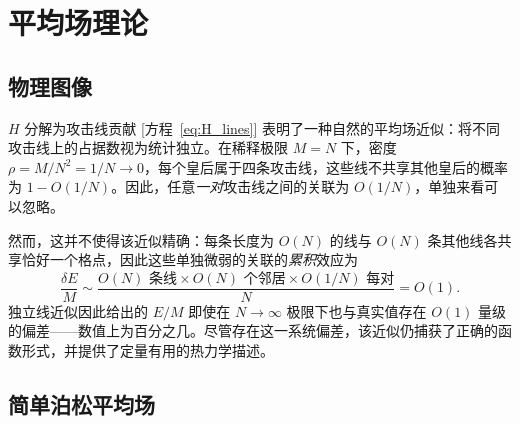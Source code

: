 \documentclass[aps, pre, reprint, amsmath, amssymb, superscriptaddress, floatfix]{revtex4-2}
\begin{document}
\section{平均场理论}
\label{sec:mf}

\subsection{物理图像}

$H$ 分解为攻击线贡献 [方程~\eqref{eq:H_lines}] 表明了一种自然的平均场近似：将不同攻击线上的占据数视为统计独立。在稀释极限 $M = N$ 下，密度 $\rho = M/N^2 = 1/N \to 0$，每个皇后属于四条攻击线，这些线不共享其他皇后的概率为 $1 - O(1/N)$。因此，任意\emph{一对}攻击线之间的关联为 $O(1/N)$，单独来看可以忽略。

然而，这并不使得该近似精确：每条长度为 $O(N)$ 的线与 $O(N)$ 条其他线各共享恰好一个格点，因此这些单独微弱的关联的\emph{累积}效应为
\begin{equation}
  \frac{\delta E}{M}
  \sim \frac{O(N)\text{ 条线} \times O(N)\text{ 个邻居} \times O(1/N)\text{ 每对}}{N}
  = O(1).
  \label{eq:mf_error}
\end{equation}
独立线近似因此给出的 $E/M$ 即使在 $N \to \infty$ 极限下也与真实值存在 $O(1)$ 量级的偏差——数值上为百分之几。尽管存在这一系统偏差，该近似仍捕获了正确的函数形式，并提供了定量有用的热力学描述。

\subsection{简单泊松平均场}
\end{document}
